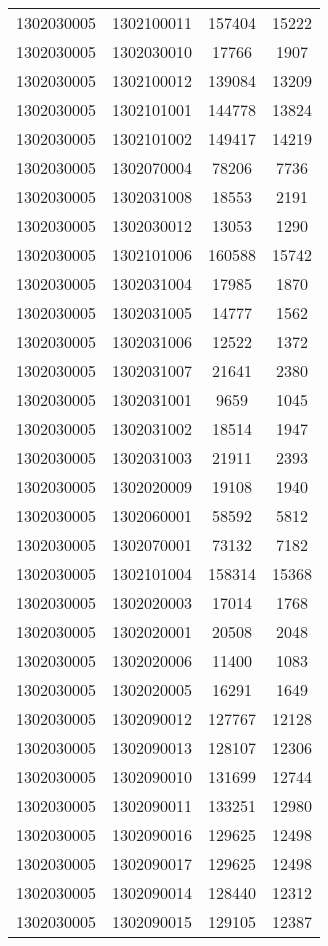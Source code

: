 \begin{longtable}{llcc}
1302030005 & 1302100011 & 157404 & 15222\\
1302030005 & 1302030010 & 17766 & 1907\\
1302030005 & 1302100012 & 139084 & 13209\\
1302030005 & 1302101001 & 144778 & 13824\\
1302030005 & 1302101002 & 149417 & 14219\\
1302030005 & 1302070004 & 78206 & 7736\\
1302030005 & 1302031008 & 18553 & 2191\\
1302030005 & 1302030012 & 13053 & 1290\\
1302030005 & 1302101006 & 160588 & 15742\\
1302030005 & 1302031004 & 17985 & 1870\\
1302030005 & 1302031005 & 14777 & 1562\\
1302030005 & 1302031006 & 12522 & 1372\\
1302030005 & 1302031007 & 21641 & 2380\\
1302030005 & 1302031001 & 9659 & 1045\\
1302030005 & 1302031002 & 18514 & 1947\\
1302030005 & 1302031003 & 21911 & 2393\\
1302030005 & 1302020009 & 19108 & 1940\\
1302030005 & 1302060001 & 58592 & 5812\\
1302030005 & 1302070001 & 73132 & 7182\\
1302030005 & 1302101004 & 158314 & 15368\\
1302030005 & 1302020003 & 17014 & 1768\\
1302030005 & 1302020001 & 20508 & 2048\\
1302030005 & 1302020006 & 11400 & 1083\\
1302030005 & 1302020005 & 16291 & 1649\\
1302030005 & 1302090012 & 127767 & 12128\\
1302030005 & 1302090013 & 128107 & 12306\\
1302030005 & 1302090010 & 131699 & 12744\\
1302030005 & 1302090011 & 133251 & 12980\\
1302030005 & 1302090016 & 129625 & 12498\\
1302030005 & 1302090017 & 129625 & 12498\\
1302030005 & 1302090014 & 128440 & 12312\\
1302030005 & 1302090015 & 129105 & 12387\\

\end{longtable}
